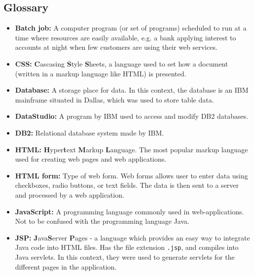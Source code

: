 \subsection{Glossary}\label{sec:glossary}

\begin{itemize}
    
    \item \textbf{Batch job:} A computer program (or set of programs) scheduled to run at a time where resources are easily available, e.g. a bank applying interest to accounts at night when few customers are using their web services.
    
    \item \textbf{CSS:} \textbf{C}ascasing \textbf{S}tyle \textbf{S}heets, a language used to set how a document (written in a markup language like HTML) is presented.
    
    \item \textbf{Database:} A storage place for data. In this context, the database is an IBM mainframe situated in Dallas, which was used to store table data.
    
    \item \textbf{DataStudio:} A program by IBM used to access and modify DB2 databases.

    \item \textbf{DB2:} Relational database system made by IBM.
    
    \item \textbf{HTML:} \textbf{H}yper\textbf{t}ext \textbf{M}arkup \textbf{L}anguage. The most popular markup language used for creating web pages and web applications.
    
    \item \textbf{HTML form:} Type of web form. Web forms allows user to enter data using checkboxes, radio buttons, or text fields. The data is then sent to a server and processed by a web application.
    
    \item \textbf{JavaScript:} A programming language commonly used in web-applications. Not to be confused with the programming language Java.
    
    \item \textbf{JSP:} \textbf{J}ava\textbf{S}erver \textbf{P}ages - a language which provides an easy way to integrate Java code into HTML files. Has the file extension \texttt{.jsp}, and compiles into Java servlets. In this context, they were used to generate servlets for the different pages in the application.
    

\end{itemize}
